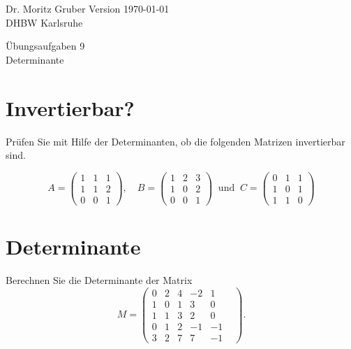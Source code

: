 




\vspace*{-20mm}
{
	\color{dhbwGray}
	Dr. Moritz Gruber	\hfill Version \today\\
	DHBW Karlsruhe\\
}

\vspace{10mm}
\begin{center}
	{
		\color{lightBlue}
		{ \LARGE 	Übungsaufgaben 9}\\[3mm]
		{\Large Determinante}
	}
\end{center}

\vspace{5mm}



\section{Invertierbar?}

Prüfen Sie mit Hilfe der Determinanten, ob die folgenden Matrizen invertierbar sind.

$$
A=\begin{pmatrix} 1 & 1 & 1 \\ 1 & 1 &2 \\ 0&0&1\end{pmatrix}, \quad 
B=\begin{pmatrix} 1 & 2 & 3 \\ 1 & 0 &2 \\ 0&0&1\end{pmatrix} \ \text{ und } \
C=\begin{pmatrix} 0 & 1 & 1 \\ 1 & 0 &1 \\ 1&1&0\end{pmatrix}
$$


\section{Determinante}

Berechnen Sie die Determinante der Matrix
$$
	M=\begin{pmatrix}
		0	& 2	& 4	& -2 & 1	\\
		1	& 0	& 1	& 3	& 0	\\
		1	& 1	& 3	& 2	& 0\\
		0	& 1	& 2	& -1	& -1	\\
		3	& 2	& 7	& 7	& -1	&
	\end{pmatrix}.
$$

